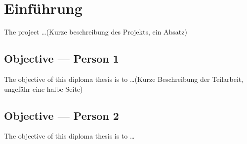 \chapter{Einführung}\label{chap:overview-introduction}

The project \dots (Kurze beschreibung des Projekts, ein Absatz)

\section{Objective --- Person 1}

The objective of this diploma thesis is to \dots (Kurze Beschreibung der Teilarbeit, ungefähr eine halbe Seite)

\section{Objective --- Person 2}

The objective of this diploma thesis is to \dots